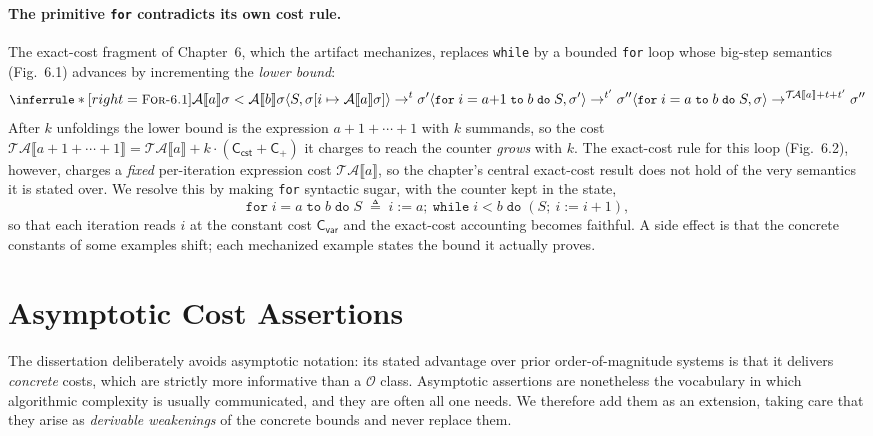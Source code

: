 \documentclass[runningheads]{llncs}
\newcommand{\State}{\sigma}
\newcommand{\aval}[1]{\mathcal{A}\llbracket #1 \rrbracket}
\newcommand{\tacost}[1]{\mathcal{T\!A}\llbracket #1 \rrbracket}
\newcommand{\evals}[4]{\langle #1, #2\rangle \rightarrow^{#3} #4}
\newcommand{\upd}[3]{#1[#2 \mapsto #3]}
\newcommand{\cst}[1]{\mathsf{C_{#1}}}
\newcommand{\BigO}{\mathcal{O}}
\newcommand{\code}[1]{\texttt{#1}}
\begin{document}
\paragraph{The primitive \code{for} contradicts its own cost rule.}
The exact-cost fragment of Chapter~6, which the artifact mechanizes, replaces
\code{while} by a bounded \code{for} loop whose big-step semantics (Fig.~6.1)
advances by incrementing the \emph{lower bound}:
\[
{\small
\inferrule*[right=\textsc{For-6.1}]
{ \aval{a}\State < \aval{b}\State
  \\ \evals{S}{\upd{\State}{i}{\aval{a}\State}}{t}{\State'}
  \\ \evals{\code{for}\;i = a{+}1\;\code{to}\;b\;\code{do}\;S}{\State'}{t'}{\State''} }
{ \evals{\code{for}\;i = a\;\code{to}\;b\;\code{do}\;S}{\State}
  {\tacost{a} + t + t'}{\State''} }
}
\]
After $k$ unfoldings the lower bound is the expression $a + 1 + \cdots + 1$ with
$k$ summands, so the cost $\tacost{a + 1 + \cdots + 1} = \tacost{a} +
k\cdot(\cst{cst} + \cst{+})$ it charges to reach the counter \emph{grows} with $k$.
The exact-cost rule for this loop (Fig.~6.2), however, charges a \emph{fixed}
per-iteration expression cost $\tacost{a}$, so the chapter's central exact-cost
result does not hold of the very semantics it is stated over.
We resolve this by making \code{for} syntactic sugar, with the counter kept in the
state,
\[
\code{for}\;i = a\;\code{to}\;b\;\code{do}\;S \;\triangleq\;
i := a;\ \code{while}\;i < b\;\code{do}\;(S;\ i := i+1),
\]
so that each iteration reads $i$ at the constant cost $\cst{var}$ and the
exact-cost accounting becomes faithful. A side effect is that the concrete
constants of some examples shift; each mechanized example states the bound it
actually proves.

\section{Asymptotic Cost Assertions}\label{sec:asymptotic}

The dissertation deliberately avoids asymptotic notation: its stated advantage
over prior order-of-magnitude systems is that it delivers \emph{concrete} costs,
which are strictly more informative than a $\BigO$ class.
Asymptotic assertions are nonetheless the vocabulary in which algorithmic
complexity is usually communicated, and they are often all one needs.
We therefore add them as an extension, taking care that they arise as
\emph{derivable weakenings} of the concrete bounds and never replace them.
\end{document}
